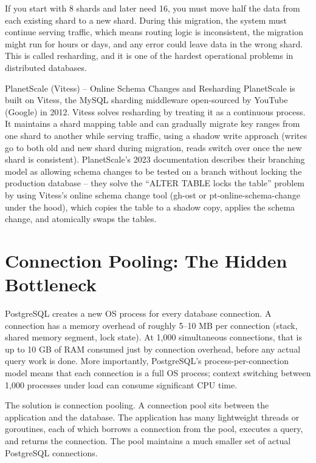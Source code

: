 \documentclass[11pt,a4paper]{article}
\begin{document}
If you start with 8 shards and later need 16, you must move half the data from each existing shard to a new shard. During this migration, the system must continue serving traffic, which means routing logic is inconsistent, the migration might run for hours or days, and any error could leave data in the wrong shard. This is called resharding, and it is one of the hardest operational problems in distributed databases.

\begin{industrybox}{PlanetScale (Vitess) -- Online Schema Changes and Resharding}
PlanetScale is built on Vitess, the MySQL sharding middleware open-sourced by YouTube (Google) in 2012. Vitess solves resharding by treating it as a continuous process. It maintains a shard mapping table and can gradually migrate key ranges from one shard to another while serving traffic, using a shadow write approach (writes go to both old and new shard during migration, reads switch over once the new shard is consistent). PlanetScale's 2023 documentation describes their branching model as allowing schema changes to be tested on a branch without locking the production database -- they solve the ``ALTER TABLE locks the table'' problem by using Vitess's online schema change tool (gh-ost or pt-online-schema-change under the hood), which copies the table to a shadow copy, applies the schema change, and atomically swaps the tables.
\end{industrybox}

\newpage

\section{Connection Pooling: The Hidden Bottleneck}

PostgreSQL creates a new OS process for every database connection. A connection has a memory overhead of roughly 5--10 MB per connection (stack, shared memory segment, lock state). At 1,000 simultaneous connections, that is up to 10 GB of RAM consumed just by connection overhead, before any actual query work is done. More importantly, PostgreSQL's process-per-connection model means that each connection is a full OS process; context switching between 1,000 processes under load can consume significant CPU time.

The solution is connection pooling. A connection pool sits between the application and the database. The application has many lightweight threads or goroutines, each of which borrows a connection from the pool, executes a query, and returns the connection. The pool maintains a much smaller set of actual PostgreSQL connections.
\end{document}
